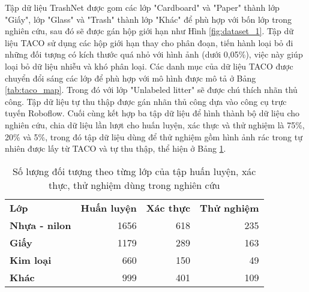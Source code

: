 \documentclass[../the.tex]{subfiles}
\begin{document}
{\fontsize{13}{12} \selectfont

Tập dữ liệu TrashNet được gom các lớp "Cardboard" và "Paper" thành lớp "Giấy", lớp "Glass" và "Trash" thành lớp "Khác" để phù hợp với bốn lớp trong nghiên cứu, sau đó sẽ được gán hộp giới hạn như Hình \ref{fig:dataset_1}.
Tập dữ liệu TACO sử dụng các hộp giới hạn thay cho phân đoạn, tiến hành loại bỏ đi những đối tượng có kích thước quá nhỏ với hình ảnh (dưới 0,05\%), việc này giúp loại bỏ dữ liệu nhiễu và khó phân loại.
Các danh mục của dữ liệu TACO được chuyển đổi sáng các lớp để phù hợp với mô hình được mô tả ở Bảng  \ref{tab:taco_map}.
Trong đó với lớp "Unlabeled litter" sẽ được chú thích nhãn thủ công.
Tập dữ liệu tự thu thập được gán nhãn thủ công dựa vào công cụ trực tuyến Roboflow.
Cuối cùng kết hợp ba tập dữ liệu để hình thành bộ dữ liệu cho nghiên cứu, chia dữ liệu lần lượt cho huấn luyện, xác thực và thử nghiệm là 75\%, 20\% và 5\%, trong đó tập dữ liệu dùng để thử nghiệm gồm hình ảnh rác trong tự nhiên được lấy từ TACO và tự thu thập, thể hiện ở Bảng \ref{tab:datasettest}.

}


\begin{table}[!h]
	\centering
	\caption{Số lượng đối tượng theo từng lớp của tập huấn luyện, xác thực, thử nghiệm dùng trong nghiên cứu}
	\begin{tabular}{|l|r|r|r|}
		\cline{1-4}
		\textbf{Lớp}          & \textbf{Huấn luyện} & \textbf{Xác thực} & \textbf{Thử nghiệm} \\ \cline{1-4}
		\textbf{Nhựa - nilon} & 1656                & 618               & 235                 \\ \cline{1-4}
		\textbf{Giấy}         & 1179                & 289               & 163                 \\ \cline{1-4}
		\textbf{Kim loại}     & 660                 & 150               & 49                  \\ \cline{1-4}
		\textbf{Khác}         & 999                 & 401               & 109                 \\ \cline{1-4}
	\end{tabular}

	\label{tab:datasettest}
\end{table}
\end{document}
